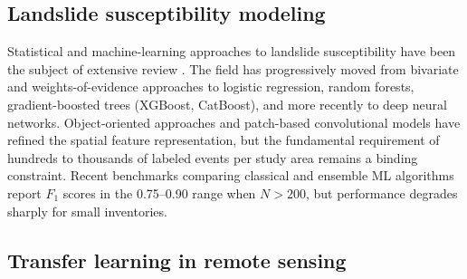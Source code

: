 \subsection{Landslide susceptibility modeling}
\label{sec:related:landslide}

Statistical and machine-learning approaches to landslide susceptibility have been the subject of extensive review \citep{reichenbach2018review, merghadi2020ml}. The field has progressively moved from bivariate and weights-of-evidence approaches to logistic regression, random forests, gradient-boosted trees (XGBoost, CatBoost), and more recently to deep neural networks.  Object-oriented approaches \citep{stumpf2011oo} and patch-based convolutional models have refined the spatial feature representation, but the fundamental requirement of hundreds to thousands of labeled events per study area remains a binding constraint. Recent benchmarks comparing classical and ensemble ML algorithms \citep{merghadi2020ml} report $F_1$ scores in the 0.75--0.90 range when $N>200$, but performance degrades sharply for small inventories. 

\subsection{Transfer learning in remote sensing}
\label{sec:related:transfer}

